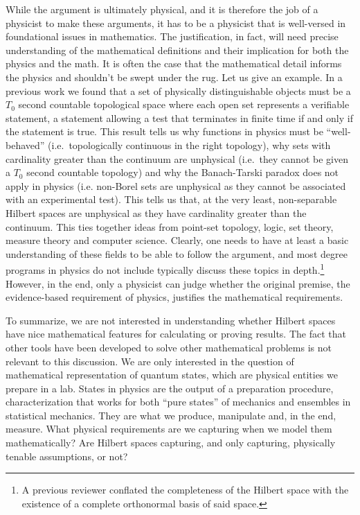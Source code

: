 \documentclass[10pt,twocolumn, nofootinbib]{revtex4-2}
\begin{document}
While the argument is ultimately physical, and it is therefore the job of a physicist to make these arguments, it has to be a physicist that is well-versed in foundational issues in mathematics. The justification, in fact, will need precise understanding of the mathematical definitions and their implication for both the physics and the math. It is often the case that the mathematical detail informs the physics and shouldn't be swept under the rug.  Let us give an example. In a previous work we found that a set of physically distinguishable objects must be a $T_0$ second countable topological space where each open set represents a verifiable statement, a statement allowing a test that terminates in finite time if and only if the statement is true. This result tells us why functions in physics must be ``well-behaved'' (i.e.~topologically continuous in the right topology), why sets with cardinality greater than the continuum are unphysical (i.e.~they cannot be given a $T_0$ second countable topology) and why the Banach-Tarski paradox does not apply in physics (i.e. non-Borel sets are unphysical as they cannot be associated with an experimental test). This tells us that, at the very least, non-separable Hilbert spaces are unphysical as they have cardinality greater than the continuum.\cite{pittphilsci18363} This ties together ideas from point-set topology, logic, set theory, measure theory and computer science. Clearly, one needs to have at least a basic understanding of these fields to be able to follow the argument, and most degree programs in physics do not include typically discuss these topics in depth.\footnote{A previous reviewer conflated the completeness of the Hilbert space with the existence of a complete orthonormal basis of said space.} However, in the end, only a physicist can judge whether the original premise, the evidence-based requirement of physics, justifies the mathematical requirements.

To summarize, we are not interested in understanding whether Hilbert spaces have nice mathematical features for calculating or proving results. The fact that other tools have been developed to solve other mathematical problems is not relevant to this discussion. We are only interested in the question of mathematical representation of quantum states, which are physical entities we prepare in a lab. States in physics are the output of a preparation procedure, characterization that works for both ``pure states'' of mechanics and ensembles in statistical mechanics. They are what we produce, manipulate and, in the end, measure. What physical requirements are we capturing when we model them mathematically? Are Hilbert spaces capturing, and only capturing, physically tenable assumptions, or not?
\end{document}
